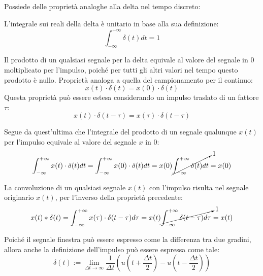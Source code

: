 \documentclass{article}
\numberwithin{equation}{subsection}
\begin{document}
Possiede delle proprietà analoghe alla delta nel tempo discreto:



L'integrale sui reali della delta è unitario in base alla sua definizione:
\begin{equation*}
    \displaystyle\int_{-\infty}^{+\infty}\delta(t)dt=1
\end{equation*}



Il prodotto di un qualsiasi segnale per la delta equivale al valore del segnale in $0$ moltiplicato per l'impulso, poiché per tutti gli altri valori nel tempo questo prodotto 
è nullo. Proprietà analoga a quella del campionamento per il continuo:
\begin{equation*}
    x(t)\cdot\delta(t)=x(0)\cdot\delta(t)
\end{equation*}
Questa proprietà può essere estesa considerando un impulso traslato di un fattore $\tau$:
\begin{equation*}
    x(t)\cdot\delta(t-\tau)=x(\tau)\cdot\delta(t-\tau)
\end{equation*}



Segue da quest'ultima che l'integrale del prodotto di un segnale qualunque $x(t)$ per l'impulso equivale al valore del segnale $x$ in $0$:
\begin{equation*}
    \displaystyle\int_{-\infty}^{+\infty}x(t)\cdot\delta(t)dt=\int_{-\infty}^{+\infty}x(0)\cdot\delta(t)dt=x(0)\cancelto{1}{\int_{-\infty}^{+\infty}\delta(t)dt}=x(0)
\end{equation*}



La convoluzione di un qualsiasi segnale $x(t)$ con l'impulso risulta nel segnale originario $x(t)$, per l'inverso della proprietà precedente: 
\begin{equation*}
    x(t)*\delta(t)=\displaystyle\int_{-\infty}^{+\infty}x(\tau)\cdot\delta(t-\tau)d\tau=x(t)\cancelto{1}{\int_{-\infty}^{+\infty}\delta(t-\tau)d\tau}=x(t)
\end{equation*}



Poiché il segnale finestra può essere espresso come la differenza tra due gradini, allora anche la definizione dell'impulso può essere espressa come tale:
\begin{equation*}
    \delta(t):=\lim_{\Delta t\to\infty}\frac{1}{\Delta t}\left(u\left(t+\frac{\Delta t}{2}\right)-u\left(t-\frac{\Delta t}{2}\right)\right)
\end{equation*}
\end{document}

